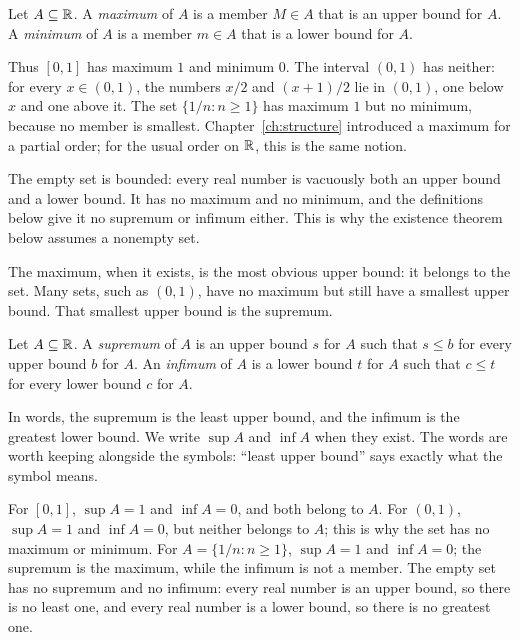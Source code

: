 \par\noindent\begin{minipage}{\linewidth}
\begin{definition}\label{ch11:def:maxmin}
Let $A\subseteq\mathbb R$. A \emph{maximum} of $A$ is a member $M\in A$ that is an upper bound for $A$. A \emph{minimum} of $A$ is a member $m\in A$ that is a lower bound for $A$.
\end{definition}
\end{minipage}\par

Thus $[0,1]$ has maximum $1$ and minimum $0$. The interval $(0,1)$ has neither: for every $x\in(0,1)$, the numbers $x/2$ and $(x+1)/2$ lie in $(0,1)$, one below $x$ and one above it. The set $\{1/n:n\ge1\}$ has maximum $1$ but no minimum, because no member is smallest. Chapter~\ref{ch:structure} introduced a maximum for a partial order; for the usual order on $\mathbb R$, this is the same notion.

The empty set is bounded: every real number is vacuously both an upper bound and a lower bound. It has no maximum and no minimum, and the definitions below give it no supremum or infimum either. This is why the existence theorem below assumes a nonempty set.

The maximum, when it exists, is the most obvious upper bound: it belongs to the set. Many sets, such as $(0,1)$, have no maximum but still have a smallest upper bound. That smallest upper bound is the supremum.

\par\noindent\begin{minipage}{\linewidth}
\begin{definition}\label{ch11:def:supinf}
Let $A\subseteq\mathbb R$. A \emph{supremum} of $A$ is an upper bound $s$ for $A$ such that $s\le b$ for every upper bound $b$ for $A$. An \emph{infimum} of $A$ is a lower bound $t$ for $A$ such that $c\le t$ for every lower bound $c$ for $A$.
\end{definition}
\end{minipage}\par

In words, the supremum is the least upper bound, and the infimum is the greatest lower bound. We write $\sup A$ and $\inf A$ when they exist. The words are worth keeping alongside the symbols: ``least upper bound'' says exactly what the symbol means.

For $[0,1]$, $\sup A=1$ and $\inf A=0$, and both belong to $A$. For $(0,1)$, $\sup A=1$ and $\inf A=0$, but neither belongs to $A$; this is why the set has no maximum or minimum. For $A=\{1/n:n\ge1\}$, $\sup A=1$ and $\inf A=0$; the supremum is the maximum, while the infimum is not a member. The empty set has no supremum and no infimum: every real number is an upper bound, so there is no least one, and every real number is a lower bound, so there is no greatest one.

